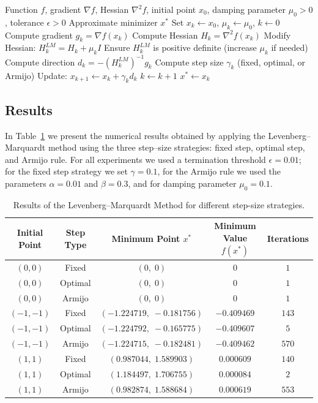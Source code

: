 \documentclass[11pt]{article}
\begin{document}
\begin{algorithm}[H]
\caption{Levenberg--Marquardt Method}
\begin{algorithmic}[1]
\Require Function $f$, gradient $\nabla f$, Hessian $\nabla^2 f$, initial point $x_0$, damping parameter $\mu_0 > 0$, tolerance $\epsilon > 0$
\Ensure Approximate minimizer $x^*$
\State Set $x_k \gets x_0$, $\mu_k \gets \mu_0$, $k \gets 0$
    \State Compute gradient $g_k = \nabla f(x_k)$
    \State Compute Hessian $H_k = \nabla^2 f(x_k)$
    \State Modify Hessian: $H^{LM}_k = H_k + \mu_k I$
    \State Ensure $H^{LM}_k$ is positive definite (increase $\mu_k$ if needed)
    \State Compute direction $d_k = - (H^{LM}_k)^{-1} g_k$
    \State Compute step size $\gamma_k$ (fixed, optimal, or Armijo)
    \State Update: $x_{k+1} \gets x_k + \gamma_k d_k$
    \State $k \gets k + 1$
\EndWhile
\State \Return $x^* \gets x_k$
\end{algorithmic}
\end{algorithm}

\subsection{Results}

In Table~\ref{table:lm} we present the numerical results obtained by 
applying the Levenberg--Marquardt method using the three step–size strategies: fixed step,
optimal step, and Armijo rule. 
For all experiments we used a termination threshold 
$\epsilon = 0.01$; for the fixed step strategy we set $\gamma = 0.1$, for the Armijo
rule we used the parameters $\alpha = 0.01$ and $\beta = 0.3$, and for damping parameter $\mu_0 = 0.1$.

\begin{table}[h!]
\centering
\begin{tabular}{c|c|c|c|c}
\textbf{Initial Point} & \textbf{Step Type} & \textbf{Minimum Point $x^*$} & \textbf{Minimum Value $f(x^*)$} & \textbf{Iterations} \\
\hline
$(0,0)$ & Fixed   & $(0,\;0)$      & $0$      & $1$ \\
$(0,0)$ & Optimal & $(0,\;0)$      & $0$      & $1$ \\
$(0,0)$ & Armijo  & $(0,\;0)$      & $0$      & $1$ \\
\hline
$(-1,-1)$ & Fixed   & $(-1.224719,\;-0.181756)$   & $-0.409469$     & $143$ \\
$(-1,-1)$ & Optimal & $(-1.224792,\;-0.165775)$   & $-0.409607$     & $5$ \\
$(-1,-1)$ & Armijo  & $(-1.224715,\;-0.182481)$   & $-0.409462$     & $570$ \\
\hline
$(1,1)$ & Fixed   & $(0.987044,\;1.589903)$      & $0.000609$      & $140$ \\
$(1,1)$ & Optimal & $(1.184497,\;1.706755)$      & $0.000084$      & $2$ \\
$(1,1)$ & Armijo  & $(0.982874,\;1.588684)$      & $0.000619$      & $553$ \\
\end{tabular}
\caption{Results of the Levenberg--Marquardt Method for different step-size strategies.}
\label{table:lm}
\end{table}
\end{document}
